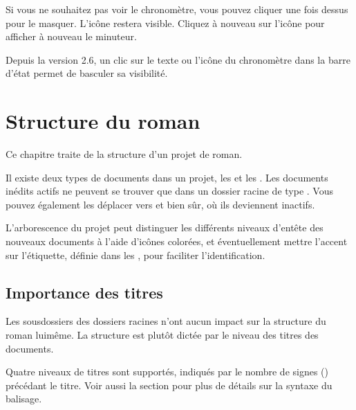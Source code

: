 \documentclass[a4paper,11pt,french]{sphinxmanual}
\begin{document}
\sphinxAtStartPar
Si vous ne souhaitez pas voir le chronomètre, vous pouvez cliquer une fois dessus pour le masquer. L’icône restera visible. Cliquez à nouveau sur l’icône pour afficher à nouveau le minuteur.

\sphinxAtStartPar
{}Depuis la version 2.6, un clic sur le texte ou l’icône du chronomètre dans la barre d’état permet de basculer sa visibilité.

\sphinxstepscope


\chapter{Structure du roman}
\label{\detokenize{project_structure:novel-structure}}\label{\detokenize{project_structure:a-struct}}\label{\detokenize{project_structure::doc}}
\sphinxAtStartPar
Ce chapitre traite de la structure d’un projet de roman.

\sphinxAtStartPar
Il existe deux types de documents dans un projet, les  et les . Les documents inédits actifs ne peuvent se trouver que dans un dossier racine de type . Vous pouvez également les déplacer vers  et  bien sûr, où ils deviennent inactifs.

\sphinxAtStartPar
L’arborescence du projet peut distinguer les différents niveaux d’en\sphinxhyphen{}tête des nouveaux documents à l’aide d’icônes colorées, et éventuellement mettre l’accent sur l’étiquette, définie dans les , pour faciliter l’identification.


\section{Importance des titres}
\label{\detokenize{project_structure:importance-of-headings}}\label{\detokenize{project_structure:a-struct-heads}}
\sphinxAtStartPar
Les sous\sphinxhyphen{}dossiers des dossiers racines n’ont aucun impact sur la structure du roman lui\sphinxhyphen{}même. La structure est plutôt dictée par le niveau des titres des documents.

\sphinxAtStartPar
Quatre niveaux de titres sont supportés, indiqués par le nombre de signes (\sphinxcode{\sphinxupquote{\#}}) précédant le titre. Voir aussi la section {\hyperref[\detokenize{usage_format:a-fmt}]{}} pour plus de détails sur la syntaxe du balisage.
\end{document}
